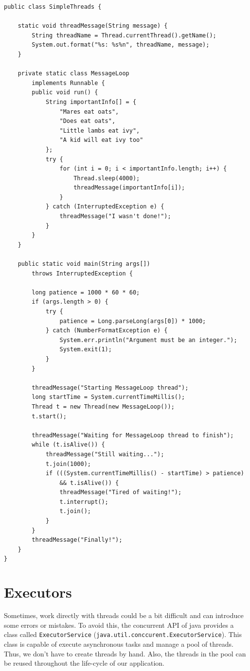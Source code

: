 \documentclass[openany, a4paper]{book}
\theoremstyle{break}
\theoremstyle{example}
\theoremstyle{note}
\theoremstyle{break}
\theoremstyle{exercise}
\begin{document}
\begin{verbatim}
public class SimpleThreads {

    static void threadMessage(String message) {
        String threadName = Thread.currentThread().getName();
        System.out.format("%s: %s%n", threadName, message);
    }

    private static class MessageLoop
        implements Runnable {
        public void run() {
            String importantInfo[] = {
                "Mares eat oats",
                "Does eat oats",
                "Little lambs eat ivy",
                "A kid will eat ivy too"
            };
            try {
                for (int i = 0; i < importantInfo.length; i++) {
                    Thread.sleep(4000);
                    threadMessage(importantInfo[i]);
                }
            } catch (InterruptedException e) {
                threadMessage("I wasn't done!");
            }
        }
    }

    public static void main(String args[])
        throws InterruptedException {

        long patience = 1000 * 60 * 60;
        if (args.length > 0) {
            try {
                patience = Long.parseLong(args[0]) * 1000;
            } catch (NumberFormatException e) {
                System.err.println("Argument must be an integer.");
                System.exit(1);
            }
        }

        threadMessage("Starting MessageLoop thread");
        long startTime = System.currentTimeMillis();
        Thread t = new Thread(new MessageLoop());
        t.start();

        threadMessage("Waiting for MessageLoop thread to finish");
        while (t.isAlive()) {
            threadMessage("Still waiting...");
            t.join(1000);
            if (((System.currentTimeMillis() - startTime) > patience)
                && t.isAlive()) {
                threadMessage("Tired of waiting!");
                t.interrupt();
                t.join();
            }
        }
        threadMessage("Finally!");
    }
}
\end{verbatim}


\section{Executors}
\label{sec:orgb90955a}

Sometimes, work directly with threads could be a bit difficult and can
introduce some errors or mistakes. To avoid this, the concurrent API of java
provides a class called \texttt{ExecutorService}
(\texttt{java.util.conccurent.ExecutorService}). This class is capable of execute
asynchronous tasks and manage a pool of threads. Thus, we don't have to
create threads by hand. Also, the threads in the pool can be reused
throughout the life-cycle of our application.
\end{document}
